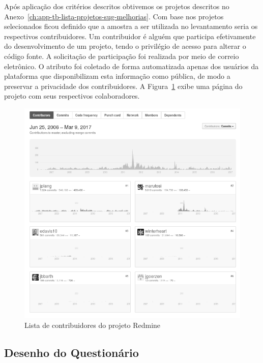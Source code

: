 Após aplicação dos critérios descritos obtivemos os projetos descritos no
Anexo~\ref{ch:app-tb-lista-projetos-sug-melhorias}. Com base nos projetos
selecionados ficou definido que a amostra a ser utilizada no levantamento seria
os respectivos contribuidores. Um contribuidor é alguém que participa
efetivamente do desenvolvimento de um projeto, tendo o privilégio de acesso para
alterar o código fonte. A solicitação de participação foi realizada por meio de
correio eletrônico. O atributo foi coletado de forma automatizada apenas dos
usuários da plataforma que disponibilizam esta informação como pública, de modo
a preservar a privacidade dos contribuidores. A
Figura~\ref{fig:redmine_contribuidores} exibe uma página do projeto com seus
respectivos colaboradores.

\begin{figure}[htpb]
	\centering
	\includegraphics[width=0.8\linewidth]{./chapter-sugestoes-melhorias-fgrm/img/redmine_contribuidores.png}
	\caption{Lista de contribuidores do projeto Redmine}
\label{fig:redmine_contribuidores}
\end{figure}

\subsection{Desenho do Questionário}
\label{ssub:sug_melhoria_desenho_questionario}

